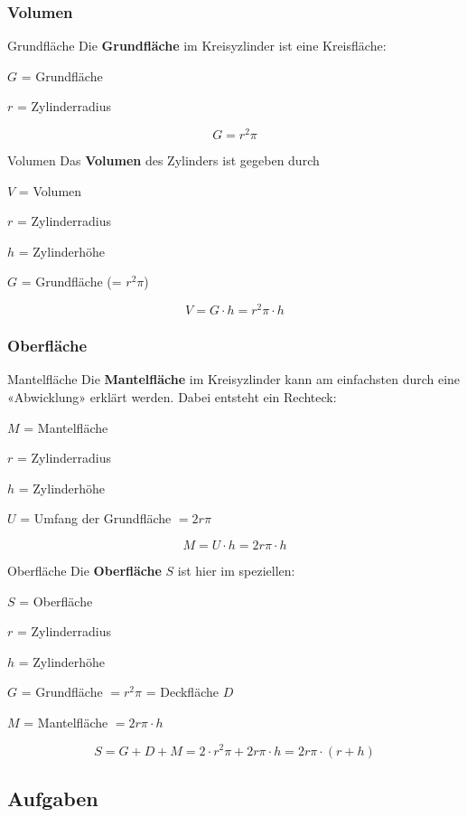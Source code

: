 \subsubsection{Volumen}

\begin{bemerkung}{Grundfläche}{}
  Die \textbf{Grundfläche} im Kreisyzlinder ist eine Kreisfläche:

  $G$ = Grundfläche

  $r$ = Zylinderradius
  
  $$G = r^2\pi$$
\end{bemerkung}

\begin{gesetz}{Volumen}{}
  Das \textbf{Volumen} des Zylinders ist gegeben durch

  $V$ = Volumen

  $r$ = Zylinderradius

  $h$ = Zylinderhöhe

  $G$ = Grundfläche (= $r^2\pi$)

  $$V = G\cdot{}h = r^2\pi\cdot{} h$$
\end{gesetz}
\newpage

\subsubsection{Oberfläche}


\begin{bemerkung}{Mantelfläche}{}
  Die \textbf{Mantelfläche} im Kreisyzlinder kann am einfachsten durch eine «Abwicklung» erklärt werden. Dabei entsteht ein Rechteck:

  $M$ = Mantelfläche

  $r$ = Zylinderradius

  $h$ = Zylinderhöhe

  $U$ = Umfang der Grundfläche $= 2r\pi$
  
  $$M = U\cdot{}h = 2r\pi\cdot{}h$$
\end{bemerkung}

\begin{gesetz}{Oberfläche}{}
  Die \textbf{Oberfläche} $S$ ist hier im speziellen:

  $S$ = Oberfläche

  $r$ = Zylinderradius

  $h$ = Zylinderhöhe

  $G$ = Grundfläche $=r^2\pi$ = Deckfläche $D$

  $M$ = Mantelfläche $=2r\pi\cdot{}h$
  
  $$S = G + D + M = 2\cdot{}r^2\pi + 2r\pi\cdot{}h = 2r\pi\cdot{}(r + h)$$
\end{gesetz}
\newpage

\subsection*{Aufgaben}

\newpage
